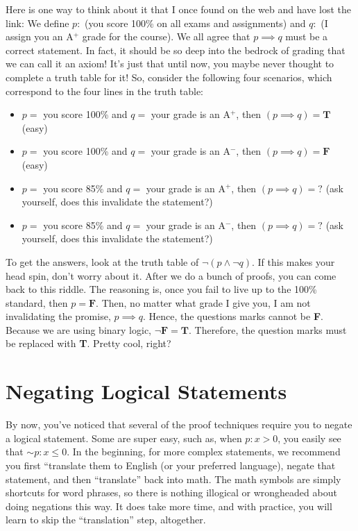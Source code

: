 \begin{rem} Here is one way to think about it that I once found on the web and have lost the link: We define $p:$ (you score 100\% on all exams and assignments) and $q:$ (I assign you an A$^+$ grade for the course). We all agree that $p \implies q$ must be a correct statement. In fact, it should be so deep into the bedrock of grading that we can call it an axiom! It's just that until now, you maybe never thought to complete a truth table for it! So, consider the following four scenarios, which correspond to the four lines in the truth table:
\begin{itemize}
    \item[]  $p=$ you score 100\% and $q=$ your grade is an A$^+$, then $(p\implies q) = \textbf{T}$ (easy)
        \item[]  $p=$ you score 100\% and $q=$ your grade is an A$^-$, then $(p\implies q) = \textbf{F}$ (easy)
            \item[]  $p=$ you score 85\% and $q=$ your grade is an A$^+$, then $(p\implies q) = \textbf{?}$ (ask yourself, does this invalidate the statement?)
        \item[]  $p=$ you score 85\% and $q=$ your grade is an A$^-$, then $(p\implies q) = \textbf{?}$ (ask yourself, does this invalidate the statement?)
\end{itemize}
To get the answers, look at the truth table of $\lnot (p \land \lnot q)$. If this makes your head spin, don't worry about it. After we do a bunch of proofs, you can come back to this riddle. The reasoning is, once you fail to live up to the 100\% standard, then $p = \textbf{F}$. Then, no matter what grade I give you, I am not invalidating the promise, $p \implies q$. Hence, the questions marks cannot be \textbf{F}. Because we are using binary logic, $\lnot \textbf{F} = \textbf{T}$. Therefore, the question marks must be replaced with  
\textbf{T}. Pretty cool, right?
 
\end{rem} 


\section{Negating Logical Statements}

By now, you've noticed that several of the proof techniques require you to negate a logical statement. Some are super easy, such as, when $p:x >0$, you easily see that $\sim p: x \le 0$. In the beginning, for more complex statements, we recommend you first ``translate them to English (or your preferred language), negate that statement, and then ``translate'' back into math. The math symbols are simply shortcuts for word phrases, so there is nothing illogical or wrongheaded about doing negations this way. It does take more time, and with practice, you will learn to skip the ``translation'' step, altogether. 

